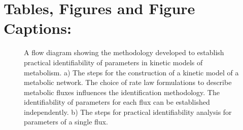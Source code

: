 \documentclass[10pt]{article}
\begin{document}
	\section{Tables, Figures and Figure Captions:}
	\begin{figure}[!tbhp]
		\caption{A flow diagram showing the methodology developed to establish practical identifiability of parameters in kinetic models of metabolism. a) The steps for the construction of a kinetic model of a metabolic network. The choice of rate law formulations to describe metabolic fluxes influences the identification methodology. The identifiability of parameters for each flux can be established independently. b) The steps for practical identifiability analysis for parameters of a single flux.}\label{fig:ident-flowchart}
	\end{figure}	
	
\end{document}
